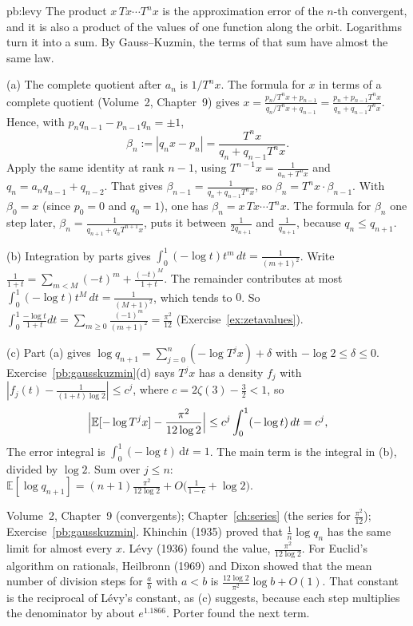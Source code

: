 \begin{solution}{pb:levy}
\idea The product $x\,Tx\cdots T^nx$ is the approximation error of the $n$-th convergent, and it is also a product of the values of one function along the orbit. Logarithms turn it into a sum. By Gauss--Kuzmin, the terms of that sum have almost the same law.

\writeup (a) The complete quotient after $a_n$ is $1/T^nx$. The formula for $x$ in terms of a complete quotient (Volume~2, Chapter~9) gives $x=\frac{p_n/T^nx+p_{n-1}}{q_n/T^nx+q_{n-1}}=\frac{p_n+p_{n-1}T^nx}{q_n+q_{n-1}T^nx}$.
Hence, with $p_nq_{n-1}-p_{n-1}q_n=\pm1$,
\[
\beta_n:=|q_nx-p_n|=\frac{T^nx}{q_n+q_{n-1}T^nx}.
\]
Apply the same identity at rank $n-1$, using $T^{n-1}x=\frac1{a_n+T^nx}$ and $q_n=a_nq_{n-1}+q_{n-2}$. That gives $\beta_{n-1}=\frac1{q_n+q_{n-1}T^nx}$, so $\beta_n=T^nx\cdot\beta_{n-1}$. With $\beta_0=x$ (since $p_0=0$ and $q_0=1$), one has $\beta_n=x\,Tx\cdots T^nx$. The formula for $\beta_n$ one step later, $\beta_n=\frac1{q_{n+1}+q_nT^{n+1}x}$, puts it between $\frac1{2q_{n+1}}$ and $\frac1{q_{n+1}}$, because $q_n\le q_{n+1}$.

(b) Integration by parts gives $\int_0^1(-\log t)t^m\,dt=\frac1{(m+1)^2}$. Write $\frac1{1+t}=\sum_{m<M}(-t)^m+\frac{(-t)^M}{1+t}$. The remainder contributes at most $\int_0^1(-\log t)t^M\,dt=\frac1{(M+1)^2}$, which tends to $0$. So $\int_0^1\frac{-\log t}{1+t}dt=\sum_{m\ge0}\frac{(-1)^m}{(m+1)^2}=\frac{\pi^2}{12}$ (Exercise~\ref{ex:zetavalues}).

(c) Part (a) gives $\log q_{n+1}=\sum_{j=0}^n(-\log T^jx)+\delta$ with $-\log2\le\delta\le0$. Exercise~\ref{pb:gausskuzmin}(d) says $T^jx$ has a density $f_j$ with $|f_j(t)-\frac1{(1+t)\log2}|\le c^j$, where $c=2\zeta(3)-\frac32<1$, so
\[
\Bigl|\mathbb E[-\log T^jx]-\frac{\pi^2}{12\log2}\Bigr|\le c^j\int_0^1(-\log t)\,dt=c^j,
\]
The error integral is $\int_0^1(-\log t)\,\mathrm dt=1$. The main term is the integral in (b), divided by $\log 2$. Sum over $j\le n$: $\mathbb E[\log q_{n+1}]=(n+1)\frac{\pi^2}{12\log2}+O\bigl(\frac1{1-c}+\log2\bigr)$.

\tools Volume~2, Chapter~9 (convergents); Chapter~\ref{ch:series} (the series for $\frac{\pi^2}{12}$); Exercise~\ref{pb:gausskuzmin}.
\leads Khinchin (1935) proved that $\frac1n\log q_n$ has the same limit for almost every $x$. L\'evy (1936) found the value, $\frac{\pi^2}{12\log2}$. For Euclid's algorithm on rationals, Heilbronn (1969) and Dixon showed that the mean number of division steps for $\frac ab$ with $a<b$ is $\frac{12\log2}{\pi^2}\log b+O(1)$. That constant is the reciprocal of L\'evy's constant, as (c) suggests, because each step multiplies the denominator by about $e^{1.1866}$. Porter found the next term.
\end{solution}

